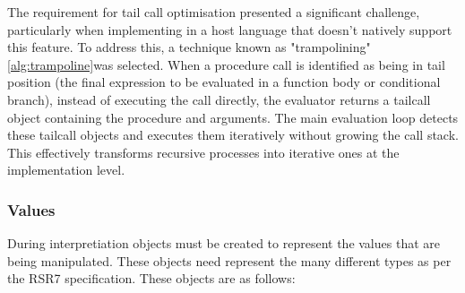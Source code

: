 \documentclass[final]{cmpreport_02}
\begin{document}
The requirement for tail call optimisation presented a significant challenge, particularly when implementing in a host language that doesn't natively support this feature. To address this, a technique known as "trampolining" \ref{alg:trampoline}was selected. When a procedure call is identified as being in tail position (the final expression to be evaluated in a function body or conditional branch), instead of executing the call directly, the evaluator returns a tailcall object containing the procedure and arguments. The main evaluation loop detects these tailcall objects and executes them iteratively without growing the call stack. This effectively transforms recursive processes into iterative ones at the implementation level.

\subsubsection{Values}
During interpretiation objects must be created to represent the values that are being manipulated. These objects need represent the many different types as per the RSR7 specification. These objects are as follows:
\end{document}
